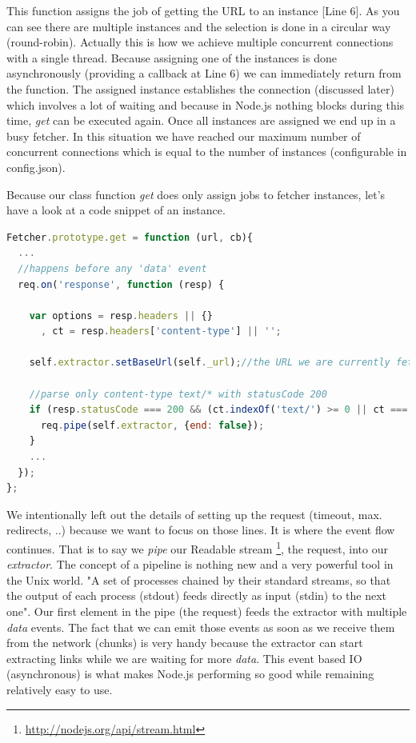 This function assigns the job of getting the URL to an instance [Line 6]. As you can see there are multiple instances and the selection is done in a circular way (round-robin). Actually this is how we achieve multiple concurrent connections with a single thread. Because assigning one of the instances is done asynchronously (providing a callback at Line 6) we can immediately return from the function. The assigned instance establishes the connection (discussed later) which involves a lot of waiting and because in Node.js nothing blocks during this time, \emph{get} can be executed again. Once all instances are assigned we end up in a busy fetcher. In this situation we have reached our maximum number of concurrent connections which is equal to the number of instances (configurable in config.json).

Because our class function \emph{get} does only assign jobs to fetcher instances, let's have a look at a code snippet of an instance.

\begin{lstlisting}[language=JavaScript]
Fetcher.prototype.get = function (url, cb){
  ...
  //happens before any 'data' event
  req.on('response', function (resp) {

    var options = resp.headers || {}
      , ct = resp.headers['content-type'] || '';

    self.extractor.setBaseUrl(self._url);//the URL we are currently fetching

    //parse only content-type text/* with statusCode 200
    if (resp.statusCode === 200 && (ct.indexOf('text/') >= 0 || ct === '')) {
      req.pipe(self.extractor, {end: false});
    }
    ...
  });
};
\end{lstlisting}

We intentionally left out the details of setting up the request (timeout, max. redirects, ..) because we want to focus on those lines. It is where the event flow continues. That is to say we \emph{pipe} our Readable stream \footnote{\url{http://nodejs.org/api/stream.html}}, the request, into our \emph{extractor}. The concept of a pipeline is nothing new and a very powerful tool in the Unix world. "A set of processes chained by their standard streams, so that the output of each process (stdout) feeds directly as input (stdin) to the next one"\cite{wiki:pipeline_unix}. Our first element in the pipe (the request) feeds the extractor with multiple \emph{data} events. The fact that we can emit those events as soon as we receive them from the network (chunks) is very handy because the extractor can start extracting links while we are waiting for more \emph{data}. This event based IO (asynchronous) is what makes Node.js performing so good while remaining relatively easy to use.

